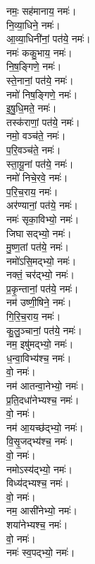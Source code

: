 \begin{multicols}{2}
\begin{flushleft}
नमः॒ सह॑मानाय॒ नमः॑।\\
नि॒व्या॒धिने॒ नमः॑।\hfill {}\\
आ॒व्या॒धिनी॑नां॒ पत॑ये॒ नमः॑।\\
नमः॑ ककु॒भाय॒ नमः॑।\\
नि॒ष॒ङ्गिणे॒ नमः॑।\\
स्ते॒नानां॒ पत॑ये॒ नमः॑।\\
नमो॑ निष॒ङ्गिणे॒ नमः॑।\\
इ॒षु॒धि॒मते॒ नमः॑।\\
तस्क॑राणां॒ पत॑ये॒ नमः॑।\\
नमो॒ वञ्च॑ते॒ नमः॑।\\
प॒रि॒वञ्च॑ते॒ नमः॑।\\
स्ता॒यू॒नां पत॑ये॒ नमः॑।\hfill {}\\
नमो॑ निचे॒रवे॒ नमः॑।\\
प॒रि॒च॒राय॒ नमः॑।\\
अर॑ण्यानां॒ पत॑ये॒ नमः॑।\\
नमः॑ सृका॒विभ्यो॒ नमः॑।\\
जिघासद्भ्यो॒ नमः॑।\\
मु॒ष्ण॒तां पत॑ये॒ नमः॑।\\
नमो॑ऽसि॒मद्भ्यो॒ नमः॑।\\
नक्तं॒ चर॑द्भ्यो॒ नमः॑।\\
प्र॒कृ॒न्तानां॒ पत॑ये॒ नमः॑।\\
नम॑ उष्णी॒षिने॒ नमः॑।\hfill {}\\
गि॒रि॒च॒राय॒ नमः॑।\\
कु॒लु॒ञ्चानां॒ पत॑ये॒  नमः॑।\\
नम॒ इषु॑मद्भ्यो॒  नमः॑।\\
ध॒न्वा॒विभ्य॑श्च॒  नमः॑।\\
वो॒  नमः॑।\\
नम॑ आतन्वा॒नेभ्यो॒ नमः॑।\\
प्र॒ति॒दधा॑नेभ्यश्च॒  नमः॑।\\
वो॒ नमः॑।\\
नम॑ आ॒यच्छ॑द्भ्यो॒  नमः॑।\\
 वि॒सृ॒जद्भ्य॑श्च॒  नमः॑।\hfill {}\\
 वो॒ नमः॑।\\
नमोऽस्य॑द्भ्यो॒  नमः॑।\\
विध्य॑द्भ्यश्च॒  नमः॑।\\
 वो॒ नमः॑।\\
नम॒ आसी॑नेभ्यो॒  नमः॑।\\
शया॑नेभ्यश्च॒  नमः॑।\\
वो॒ नमः॑।\\
नमः॑ स्व॒पद्भ्यो॒  नमः॑।\\

\end{flushleft}
\end{multicols}
